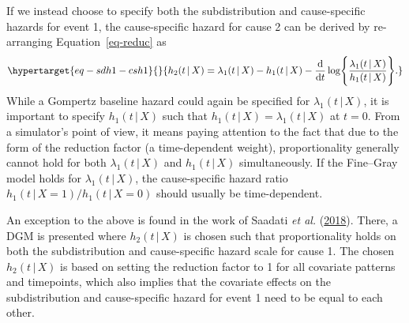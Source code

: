 \documentclass[
  letterpaper,
  DIV=11,
  numbers=noendperiod]{scrreprt}
\newcommand{\given}{\,|\,}
\newcommand\diff{\mathop{}\!\mathrm{d}}
\begin{document}
If we instead choose to specify both the subdistribution and
cause-specific hazards for event 1, the cause-specific hazard for cause
2 can be derived by re-arranging Equation~\ref{eq-reduc} as
\begin{equation}\protect\hypertarget{eq-sdh1-csh1}{}{
h_2(t \given X) = \lambda_1(t \given X) - h_1(t \given X) - \frac{\diff}{\diff t} \log \Biggl\{ \frac{\lambda_1(t \given X)}{h_1(t \given X)}\Biggr\}.
}\label{eq-sdh1-csh1}\end{equation} While a Gompertz baseline hazard
could again be specified for \(\lambda_1(t \given X)\), it is important
to specify \(h_1(t \given X)\) such that
\(h_1(t \given X) = \lambda_1(t \given X)\) at \(t = 0\). From a
simulator's point of view, it means paying attention to the fact that
due to the form of the reduction factor (a time-dependent weight),
proportionality generally cannot hold for both \(\lambda_1(t \given X)\)
and \(h_1(t \given X)\) simultaneously. If the Fine--Gray model holds
for \(\lambda_1(t \given X)\), the cause-specific hazard ratio
\(h_1(t \given X=1) / h_1(t \given X=0)\) should usually be
time-dependent.

An exception to the above is found in the work of Saadati \emph{et al.}
(\protect\hyperlink{ref-saadatiPredictionAccuracyVariable2018}{2018}).
There, a DGM is presented where \(h_2(t \given X)\) is chosen such that
proportionality holds on both the subdistribution and cause-specific
hazard scale for cause 1. The chosen \(h_2(t \given X)\) is based on
setting the reduction factor to 1 for all covariate patterns and
timepoints, which also implies that the covariate effects on the
subdistribution and cause-specific hazard for event 1 need to be equal
to each other.
\end{document}
